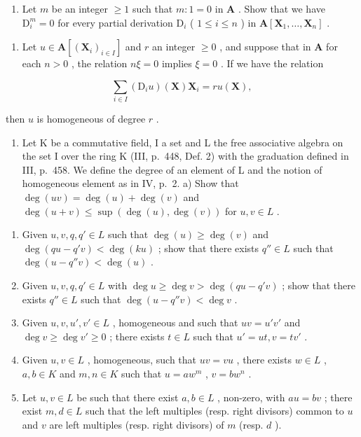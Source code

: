 \begin{enumerate}
\def\labelenumi{\alph{enumi})}
\setcounter{enumi}{1}
\tightlist
\item
  Let \(m\) be an integer \(\geqslant 1\) such that \(m: 1 = 0\) in \(\mathbf{A}\) . Show that we have \(\mathrm{D}_i^m = 0\) for every partial derivation \(\mathrm{D}_i\) ( \(1 \leqslant i \leqslant n\) ) in \(\mathbf{A}[\mathbf{X}_1, \ldots, \mathbf{X}_n]\) .
\end{enumerate}

\begin{enumerate}
\def\labelenumi{\arabic{enumi})}
\setcounter{enumi}{4}
\tightlist
\item
  Let \(u \in \mathbf{A}[(\mathbf{X}_i)_{i \in I}]\) and \(r\) an integer \(\geqslant 0\) , and suppose that in \(\mathbf{A}\) for each \(n > 0\) , the relation \(n\xi = 0\) implies \(\xi = 0\) . If we have the relation
\end{enumerate}

\[
\sum_ {i \in I} \left(\mathrm{D} _ {i} u\right) (\mathbf {X}) \mathbf {X} _ {i} = r u (\mathbf {X}),
\]

then \(u\) is homogeneous of degree \(r\) .

\begin{enumerate}
\def\labelenumi{\arabic{enumi})}
\setcounter{enumi}{5}
\tightlist
\item
  Let K be a commutative field, I a set and L the free associative algebra on the set I over the ring K (III, p.~448, Def. 2) with the graduation defined in III, p.~458. We define the degree of an element of L and the notion of homogeneous element as in IV, p.~2. a) Show that \(\deg(uv) = \deg(u) + \deg(v)\) and \(\deg(u + v) \leqslant \sup(\deg(u), \deg(v))\) for \(u, v \in L\) .
\end{enumerate}

\begin{enumerate}
\def\labelenumi{\alph{enumi})}
\setcounter{enumi}{1}
\item
  Given \(u, v, q, q' \in L\) such that \(\deg(u) \geqslant \deg(v)\) and \(\deg(qu - q'v) < \deg(ku)\) ; show that there exists \(q'' \in L\) such that \(\deg(u - q''v) < \deg(u)\) .
\item
  Given \(u, v, q, q' \in L\) with \(\deg u \geqslant \deg v > \deg (qu - q'v)\) ; show that there exists \(q'' \in L\) such that \(\deg (u - q''v) < \deg v\) .
\item
  Given \(u, v, u', v' \in L\) , homogeneous and such that \(uv = u'v'\) and \(\deg v \geqslant \deg v' \geqslant 0\) ; there exists \(t \in L\) such that \(u' = ut, v = tv'\) .
\item
  Given \(u, v \in L\) , homogeneous, such that \(uv = vu\) , there exists \(w \in L\) , \(a, b \in K\) and \(m, n \in K\) such that \(u = aw^m\) , \(v = bw^n\) .
\item
  Let \(u, v \in L\) be such that there exist \(a, b \in L\) , non-zero, with \(au = bv\) ; there exist \(m, d \in L\) such that the left multiples (resp. right divisors) common to \(u\) and \(v\) are left multiples (resp. right divisors) of \(m\) (resp. \(d\) ).
\end{enumerate}

